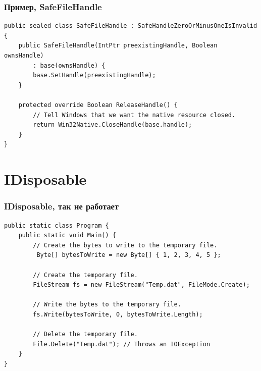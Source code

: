 \documentclass[xetex,mathserif,serif]{beamer}
\begin{document}
    \begin{frame}[fragile]
        \frametitle{Пример, SafeFileHandle}
        \begin{scriptsize}
            \begin{verbatim}
public sealed class SafeFileHandle : SafeHandleZeroOrMinusOneIsInvalid {
    public SafeFileHandle(IntPtr preexistingHandle, Boolean ownsHandle)
        : base(ownsHandle) {
        base.SetHandle(preexistingHandle);
    }

    protected override Boolean ReleaseHandle() {
        // Tell Windows that we want the native resource closed.
        return Win32Native.CloseHandle(base.handle);
    }
}
            \end{verbatim}
        \end{scriptsize}
    \end{frame}

    \section{IDisposable}

    \begin{frame}[fragile]
        \frametitle{IDisposable, так не работает}
        \begin{scriptsize}
            \begin{verbatim}
public static class Program {
    public static void Main() {
        // Create the bytes to write to the temporary file.
         Byte[] bytesToWrite = new Byte[] { 1, 2, 3, 4, 5 };

        // Create the temporary file.
        FileStream fs = new FileStream("Temp.dat", FileMode.Create);

        // Write the bytes to the temporary file.
        fs.Write(bytesToWrite, 0, bytesToWrite.Length);

        // Delete the temporary file.
        File.Delete("Temp.dat"); // Throws an IOException
    }
}
            \end{verbatim}
        \end{scriptsize}
    \end{frame}
\end{document}
